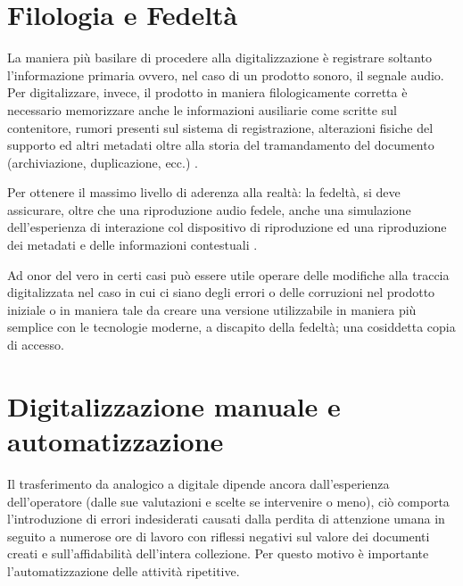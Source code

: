 \section{Filologia e Fedeltà}
La maniera più basilare di procedere alla digitalizzazione è registrare soltanto l'informazione primaria ovvero, nel caso di un prodotto sonoro, il segnale audio.
Per digitalizzare, invece, il prodotto in maniera filologicamente corretta è necessario memorizzare anche le informazioni ausiliarie come scritte sul contenitore, rumori presenti sul sistema di registrazione, alterazioni fisiche del supporto ed altri metadati oltre alla storia del tramandamento del documento (archiviazione, duplicazione, ecc.) \cite{prettoComputingMethodologiesSupporting2018}.

Per ottenere il massimo livello di aderenza alla realtà: la fedeltà, si deve assicurare, oltre che una riproduzione audio fedele, anche una simulazione dell'esperienza di interazione col dispositivo di riproduzione ed una riproduzione dei metadati e delle informazioni contestuali \cite{fantozziTapeMusicArchives2017}.

Ad onor del vero in certi casi può essere utile operare delle modifiche alla traccia digitalizzata nel caso in cui ci siano degli errori o delle corruzioni nel prodotto iniziale o in maniera tale da creare una versione utilizzabile in maniera più semplice con le tecnologie moderne, a discapito della fedeltà; una cosiddetta copia di accesso.

\section{Digitalizzazione manuale e automatizzazione}
Il trasferimento da analogico a digitale dipende ancora dall'esperienza dell'operatore (dalle sue valutazioni e scelte se intervenire o meno), ciò comporta l'introduzione di errori indesiderati causati dalla perdita di attenzione umana in seguito a numerose ore di lavoro con riflessi negativi sul valore dei documenti creati e sull'affidabilità dell'intera collezione.
Per questo motivo è importante l'automatizzazione delle attività ripetitive.